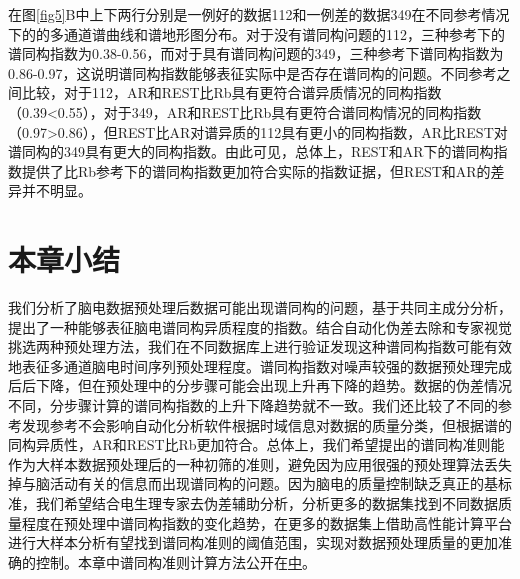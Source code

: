 在图\ref{fig5}B中上下两行分别是一例好的数据112和一例差的数据349在不同参考情况下的的多通道谱曲线和谱地形图分布。对于没有谱同构问题的112，三种参考下的谱同构指数为0.38-0.56，而对于具有谱同构问题的349，三种参考下谱同构指数为0.86-0.97，这说明谱同构指数能够表征实际中是否存在谱同构的问题。不同参考之间比较，对于112，AR和REST比Rb具有更符合谱异质情况的同构指数（0.39<0.55），对于349，AR和REST比Rb具有更符合谱同构情况的同构指数（0.97>0.86），但REST比AR对谱异质的112具有更小的同构指数，AR比REST对谱同构的349具有更大的同构指数。由此可见，总体上，REST和AR下的谱同构指数提供了比Rb参考下的谱同构指数更加符合实际的指数证据，但REST和AR的差异并不明显。

\section{本章小结}
我们分析了脑电数据预处理后数据可能出现谱同构的问题，基于共同主成分分析，提出了一种能够表征脑电谱同构异质程度的指数。结合自动化伪差去除和专家视觉挑选两种预处理方法，我们在不同数据库上进行验证发现这种谱同构指数可能有效地表征多通道脑电时间序列预处理程度。谱同构指数对噪声较强的数据预处理完成后后下降，但在预处理中的分步骤可能会出现上升再下降的趋势。数据的伪差情况不同，分步骤计算的谱同构指数的上升下降趋势就不一致。我们还比较了不同的参考发现参考不会影响自动化分析软件根据时域信息对数据的质量分类，但根据谱的同构异质性，AR和REST比Rb更加符合。总体上，我们希望提出的谱同构准则能作为大样本数据预处理后的一种初筛的准则，避免因为应用很强的预处理算法丢失掉与脑活动有关的信息而出现谱同构的问题。因为脑电的质量控制缺乏真正的基标准，我们希望结合电生理专家去伪差辅助分析，分析更多的数据集找到不同数据质量程度在预处理中谱同构指数的变化趋势，在更多的数据集上借助高性能计算平台进行大样本分析有望找到谱同构准则的阈值范围，实现对数据预处理质量的更加准确的控制。本章中谱同构准则计算方法公开在\href{https://github.com/ShiangHu/PaLOS-index.git}中。